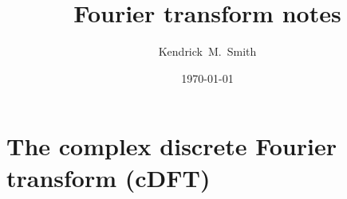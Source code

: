 \documentclass[aps,prd,superscriptaddress,groupedaddress,nofootinbib,nobibnotes]{revtex4}
\begin{document}
\title{Fourier transform notes}

\author{Kendrick~M.~Smith}

\date{\today}


\maketitle

\section{The complex discrete Fourier transform (cDFT)}
\end{document}
